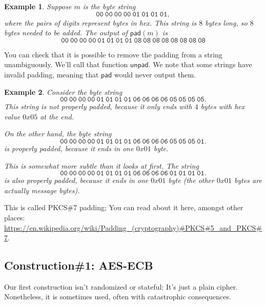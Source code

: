 \documentclass[11pt]{article}
\newtheorem{example}{Example}
\newcommand{\pad}{\mathsf{pad}}
\newcommand{\unpad}{\mathsf{unpad}}
\begin{document}
\begin{example}
    Suppose $m$ is the byte string 
    \[
        \mathtt{00\ 00\ 00\ 00\ 01\ 01\ 01\ 01},
    \]
    where the pairs of digits represent bytes in hex.
    This string is $8$ bytes long, so $8$ bytes needed to be added.
    The output of $\pad(m)$ is
    \[
        \mathtt{00\ 00\ 00\ 00\ 01\ 01\ 01\ 01\ 08\ 08\ 08\ 08\ 08\ 08\ 08\ 08}
    \]
\end{example}

You can check that it is possible to remove the padding from a string
unambiguously. We'll call that function $\unpad$. We note that some strings
have invalid padding, meaning that $\pad$ would never output them.
\begin{example}
    Consider the byte string
    \[
        \mathtt{00\ 00\ 00\ 00\ 01\ 01\ 01\ 01\ 06\ 06\ 06\ 06\ 05\ 05\ 05\ 05}.
    \]
    This string is not properly padded, because it only ends with $4$ bytes
    with hex value $0x05$ at the end.

    On the other hand, the byte string
    \[
        \mathtt{00\ 00\ 00\ 00\ 01\ 01\ 01\ 01\ 06\ 06\ 06\ 06\ 05\ 05\ 05\ 01}.
    \]
    \emph{is} properly padded, because it ends in one $0x01$ byte.

    This is somewhat more subtle than it looks at first. The string
    \[
        \mathtt{00\ 00\ 00\ 00\ 01\ 01\ 01\ 01\ 06\ 06\ 06\ 06\ 01\ 01\ 01\ 01}.
    \]
    is also properly padded, because it ends in one $0x01$ byte (the other
    $0x01$ bytes are actually message bytes).
\end{example}
This is called PKCS\#7 padding; You can read about it here, amongst other
places:
\url{https://en.wikipedia.org/wiki/Padding_(cryptography)#PKCS#5_and_PKCS#7}.


\subsection{Construction\#1: AES-ECB}

Our first construction isn't randomized or stateful; It's just a plain cipher.
Nonetheless, it is sometimes used, often with catastrophic consequences.
\end{document}
